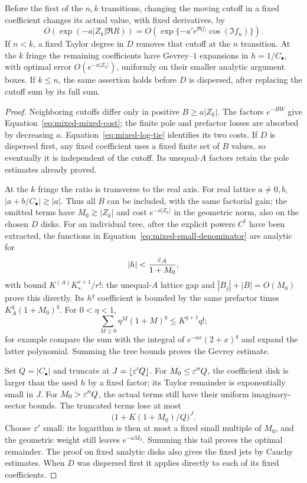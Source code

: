 \begin{lemma}\label{lem:mixed-small-formal}
Before the first of the $n,k$ transitions, changing the moving
cutoff in a fixed coefficient changes its actual value, with
fixed derivatives, by
\begin{equation}\label{eq:mixed-mixed-cost}
 O\left(\exp(-a|Z_k|\Re R)\right)
 =O\left(\exp\{-a' e^{\Re f_i}\cos(\Im f_n)\}\right).
\end{equation}
If $n<k$, a fixed Taylor degree in $D$ removes that cutoff at the
$n$ transition. At the $k$ fringe the remaining coefficients have
Gevrey--$1$ expansions in $h=1/C_\bullet$, with optimal error
$O(e^{-a|Z_k|})$, uniformly on their smaller analytic argument
boxes. If $k\leq n$, the same assertion holds before $D$ is
dispersed, after replacing the cutoff sum by its full sum.
\end{lemma}

\begin{proof}
Neighboring cutoffs differ only in positive $B\geq a|Z_k|$.
The factors $e^{-BW}$ give Equation~\eqref{eq:mixed-mixed-cost};
the finite pole and prefactor losses are absorbed by decreasing
$a$. Equation~\eqref{eq:mixed-log-tie} identifies its two costs.
If $D$ is dispersed first, any fixed coefficient uses a fixed
finite set of $B$ values, so eventually it is independent of the
cutoff. Its unequal-$A$ factors retain the pole estimates already
proved.

At the $k$ fringe the ratio is transverse to the real axis. For
real lattice $a\ne0,b$,
$|a+b/C_\bullet|\gtrsim|a|$. Thus all $B$ can be included, with
the same factorial gain; the omitted terms have $M_0\gtrsim|Z_k|$
and cost $e^{-a|Z_k|}$ in the geometric norm, also on the chosen
$D$ disks. For an individual tree, after the explicit powers
$C^t$ have been extracted, the functions in
Equation~\eqref{eq:mixed-small-denominator} are analytic for
\[
 |h|<\frac{\varepsilon_A}{1+M_0},
\]
with bound $K^{(A)}K_*^{r+1}/r!$: the unequal-$A$ lattice gap and
$|B_j|+|B|=O(M_0)$ prove this directly. Its $h^q$ coefficient
is bounded by the same prefactor times $K_A^q(1+M_0)^q$.
For $0<\eta<1$,
\[
 \sum_{M\geq0}\eta^M(1+M)^q\leq K^{q+1}q!;
\]
for example compare the sum with the integral of
$e^{-a x}(2+x)^q$ and expand the latter polynomial. Summing the
tree bounds proves the Gevrey estimate.

Set $Q=|C_\bullet|$ and truncate at $J=\lfloor\varepsilon'Q\rfloor$.
For $M_0\leq\varepsilon''Q$, the coefficient disk is larger than the
used $h$ by a fixed factor; its Taylor remainder is exponentially
small in $J$. For $M_0>\varepsilon''Q$, the actual terms still have their
uniform imaginary-sector bounds. The truncated terms lose at most
\[
 \bigl(1+K(1+M_0)/Q\bigr)^J.
\]
Choose $\varepsilon'$ small: its logarithm is then at most a fixed small
multiple of $M_0$, and the geometric weight still leaves
$e^{-aM_0}$. Summing this tail proves the optimal remainder.
The proof on fixed analytic disks also gives the fixed jets by
Cauchy estimates. When $D$ was dispersed first it applies directly
to each of its fixed coefficients.
\end{proof}

